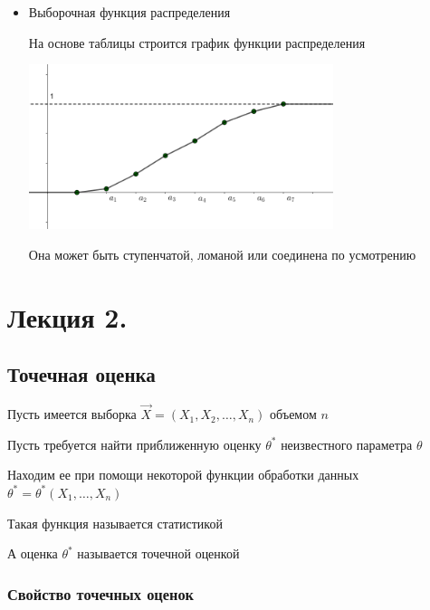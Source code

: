 \documentclass[12pt]{article}
\begin{document}
\begin{itemize}
    \item Выборочная функция распределения

    На основе таблицы строится график функции распределения

    \begin{center}
        \includegraphics[width=0.7\textwidth]{mathstat/images/mathstat_2025_02_11_3}
    \end{center}

    Она может быть ступенчатой, ломаной или соединена по усмотрению

\end{itemize}











\section{Лекция 2.}

\subsection{Точечная оценка}

Пусть имеется выборка $\vec{X} = (X_1, X_2, \dots, X_n)$ объемом $n$

Пусть требуется найти приближенную оценку $\theta^*$ неизвестного параметра $\theta$

Находим ее при помощи некоторой функции обработки данных $\theta^* = \theta^*(X_1, \dots, X_n)$

\Def Такая функция называется статистикой

\Defs А оценка $\theta^*$ называется точечной оценкой

\subsubsection{Свойство точечных оценок}
\end{document}
